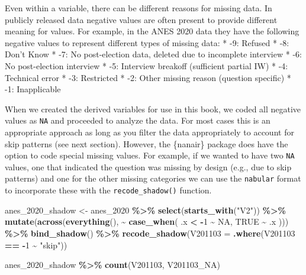 \documentclass[
]{krantz}
\makeatletter
\newenvironment{Shaded}{\begin{snugshade}}{\end{snugshade}}
\newcommand{\AttributeTok}[1]{\textcolor[rgb]{0.27,0.27,0.27}{#1}}
\newcommand{\ConstantTok}[1]{\textcolor[rgb]{0.37,0.37,0.37}{#1}}
\newcommand{\DecValTok}[1]{\textcolor[rgb]{0.06,0.06,0.06}{#1}}
\newcommand{\FunctionTok}[1]{\textcolor[rgb]{0.27,0.27,0.27}{\textbf{#1}}}
\newcommand{\NormalTok}[1]{#1}
\newcommand{\OtherTok}[1]{\textcolor[rgb]{0.37,0.37,0.37}{#1}}
\newcommand{\SpecialCharTok}[1]{\textcolor[rgb]{0.43,0.43,0.43}{\textbf{#1}}}
\newcommand{\StringTok}[1]{\textcolor[rgb]{0.5,0.5,0.5}{#1}}
\newenvironment{kframe}{%
\medskip{}
\setlength{\fboxsep}{.8em}
 \def\at@end@of@kframe{}%
 \ifinner\ifhmode%
  \def\at@end@of@kframe{\end{minipage}}%
  \begin{minipage}{\columnwidth}%
 \fi\fi%
 \def\FrameCommand##1{\hskip\@totalleftmargin \hskip-\fboxsep
 \colorbox{shadecolor}{##1}\hskip-\fboxsep
     \hskip-\linewidth \hskip-\@totalleftmargin \hskip\columnwidth}%
 \MakeFramed {\advance\hsize-\width
   \@totalleftmargin\z@ \linewidth\hsize
   \@setminipage}}%
 {\par\unskip\endMakeFramed%
 \at@end@of@kframe}
\renewenvironment{Shaded}{\begin{kframe}}{\end{kframe}}
\makeatother
\begin{document}
Even within a variable, there can be different reasons for missing data. In publicly released data negative values are often present to provide different meaning for values. For example, in the ANES 2020 data they have the following negative values to represent different types of missing data:
* -9: Refused
* -8: Don't Know
* -7: No post-election data, deleted due to incomplete interview
* -6: No post-election interview
* -5: Interview breakoff (sufficient partial IW)
* -4: Technical error
* -3: Restricted
* -2: Other missing reason (question specific)
* -1: Inapplicable

When we created the derived variables for use in this book, we coded all negative values as \texttt{NA} and proceeded to analyze the data. For most cases this is an appropriate approach as long as you filter the data appropriately to account for skip patterns (see next section). However, the \{nanair\} package does have the option to code special missing values. For example, if we wanted to have two \texttt{NA} values, one that indicated the question was missing by design (e.g., due to skip patterns) and one for the other missing categories we can use the \texttt{nabular} format to incorporate these with the \texttt{recode\_shadow()} function.

\begin{Shaded}
\begin{Highlighting}[]
\NormalTok{anes\_2020\_shadow }\OtherTok{\textless{}{-}}\NormalTok{ anes\_2020 }\SpecialCharTok{\%\textgreater{}\%}
  \FunctionTok{select}\NormalTok{(}\FunctionTok{starts\_with}\NormalTok{(}\StringTok{"V2"}\NormalTok{)) }\SpecialCharTok{\%\textgreater{}\%}
  \FunctionTok{mutate}\NormalTok{(}\FunctionTok{across}\NormalTok{(}\FunctionTok{everything}\NormalTok{(), }\SpecialCharTok{\textasciitilde{}} \FunctionTok{case\_when}\NormalTok{(}
\NormalTok{    .x }\SpecialCharTok{\textless{}} \SpecialCharTok{{-}}\DecValTok{1} \SpecialCharTok{\textasciitilde{}} \ConstantTok{NA}\NormalTok{,}
    \ConstantTok{TRUE} \SpecialCharTok{\textasciitilde{}}\NormalTok{ .x}
\NormalTok{  ))) }\SpecialCharTok{\%\textgreater{}\%}
  \FunctionTok{bind\_shadow}\NormalTok{() }\SpecialCharTok{\%\textgreater{}\%}
  \FunctionTok{recode\_shadow}\NormalTok{(}\AttributeTok{V201103 =} \FunctionTok{.where}\NormalTok{(V201103 }\SpecialCharTok{==} \SpecialCharTok{{-}}\DecValTok{1} \SpecialCharTok{\textasciitilde{}} \StringTok{"skip"}\NormalTok{))}

\NormalTok{anes\_2020\_shadow }\SpecialCharTok{\%\textgreater{}\%}
  \FunctionTok{count}\NormalTok{(V201103, V201103\_NA)}
\end{Highlighting}
\end{Shaded}
\end{document}
